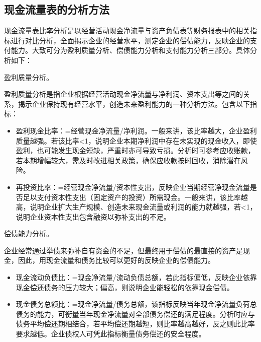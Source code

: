 \subsection {现金流量表的分析方法}

    现金流量表比率分析是以经营活动现金净流量与资产负债表等财务报表中的相关指标进行对比分析，全面揭示企业的经营水平，测定企业的偿债能力，反映企业的支付能力。大致可分为盈利质量分析、偿债能力分析和支付能力分析三部分。具体分析如下：

    \begin{enumerate.zh}
    \item  盈利质量分析。

    盈利质量分析是指企业根据经营活动现金净流量与净利润、资本支出等之间的关系，揭示企业保持现有经营水平，创造未来盈利能力的一种分析方法。包含以下指标：

        \begin{itemize}
            \item  盈利现金比率：=经营现金净流量/净利润。一般来讲，该比率越大，企业盈利质量越强。若该比率<1，说明企业本期净利润中存在未实现的现金收入，即使盈利，也可能发生现金短缺，严重时亦可导致亏损。分析时可参考应收账款，若本期增幅较大，需及时改进相关政策，确保应收款按时回收，消除潜在风险。

            \item  再投资比率：=经营现金净流量/资本性支出，反映企业当期经营净现金流量是否足以支付资本性支出（固定资产的投资）所需现金。一般来讲，该比率越高，说明企业扩大生产规模、创造未来现金流量或利润的能力就越强，若<1，说明企业资本性支出包含融资以弥补支出的不足。
        \end{itemize}

    \item  偿债能力分析。

    企业经常通过举债来弥补自有资金的不足，但最终用于偿债的最直接的资产是现金，因此，用现金流量和债务比较可以更好的反映企业的偿债能力。

        \begin{itemize}
            \item  现金流动负债比：=现金净流量/流动负债总额，若此指标偏低，反映企业依靠现金偿还债务的压力较大；偏高，则说明企业能轻松的依靠现金偿债。

            \item  现金债务总额比：=现金净流量/债务总额，该指标反映当年现金净流量负荷总债务的能力，可衡量当年现金净流量对全部债务偿还的满足程度。分析时应与债务平均偿还期相结合，若平均偿还期越短，则比率越高越好，反之则此比率要求越低。企业债权人可凭此指标衡量债务偿还的安全程度。


\end{itemize}
\end{enumerate.zh}
